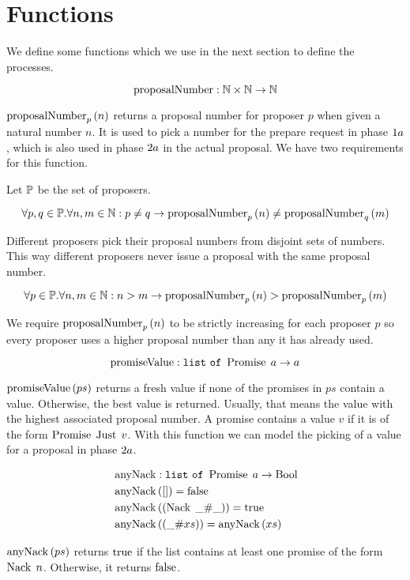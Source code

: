 \section{Functions}
We define some functions which we use in the next section to define the processes.

\[\proposalNumberName : \mathbb{N} \times \mathbb{N} \to \mathbb{N}\]

$\proposalNumber{n}{p}$ returns a proposal number for proposer $p$ when given a natural number $n$.
It is used to pick a number for the prepare request in phase $\POneA$, which is also used in phase $\PTwoA$ in the actual proposal.
We have two requirements for this function.

Let $\SetOfProposers$ be the set of proposers.

\[\forall p,q \in \SetOfProposers . \forall n,m \in \mathbb{N}: p \neq q \to \proposalNumber{n}{p} \neq \proposalNumber{m}{q}\]

Different proposers pick their proposal numbers from disjoint sets of numbers.
This way different proposers never issue a proposal with the same proposal number.

\[\forall p \in \SetOfProposers . \forall n,m \in \mathbb{N}: n > m \to \proposalNumber{n}{p} > \proposalNumber{m}{p}\]

We require $\proposalNumber{n}{p}$ to be strictly increasing for each proposer $p$ so every proposer uses a higher proposal number than any it has already used.

\[\promiseValueName : \List{\Promise{a}} \to a\]

$\promiseValue{ps}$ returns a fresh value if none of the promises in $ps$ contain a value. Otherwise, the best value is returned. Usually, that means the value with the highest associated proposal number.
A promise contains a value $v$ if it is of the form $\Promise{\Just{v}}$.
With this function we can model the picking of a value for a proposal in phase $\PTwoA$.

\begin{align*}
&\anyNackName : \List{\Promise{a}} \to \Bool\\
&\anyNack{\EmptyList} = \False\\
&\anyNack{\ListPattern{\Nack{\Wildcard}}{\Wildcard}} = \True\\
&\anyNack{\ListPattern{\Wildcard}{xs}} = \anyNack{xs}
\end{align*}

$\anyNack{ps}$ returns $\True$ if the list contains at least one promise of the form $\Nack{n}$.
Otherwise, it returns $\False$.

